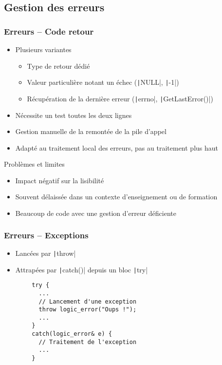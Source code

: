\documentclass[C++.tex]{subfiles}
\begin{document}
\subsection*{Gestion des erreurs}
\begin{frame}[fragile]
	\frametitle{Erreurs -- Code retour}
	\begin{itemize}
		\item Plusieurs variantes
		\begin{itemize}
			\item Type de retour dédié
			\item Valeur particulière notant un échec (\texttt|NULL|, \texttt|-1|)
			\item Récupération de la dernière erreur (\texttt|errno|, \texttt|GetLastError()|)
		\end{itemize}
		\item Nécessite \og un test toutes les deux lignes\fg{}
		\item Gestion manuelle de la remontée de la pile d'appel
		\item Adapté au traitement local des erreurs, pas au traitement \og plus haut\fg{}
	\end{itemize}

	\begin{alertblock}{Problèmes et limites}
		\begin{itemize}
			\item Impact négatif sur la lisibilité
			\item Souvent délaissée dans un contexte d'enseignement ou de formation
			\item Beaucoup de code avec une gestion d'erreur déficiente
		\end{itemize}
	\end{alertblock}
\end{frame}

\begin{frame}[fragile]
	\frametitle{Erreurs -- Exceptions}
	\begin{itemize}
		\item Lancées par \texttt|throw|
		\item Attrapées par \texttt|catch()| depuis un bloc \texttt|try|
	\end{itemize}

	\begin{verbatim}
		try {
		  ...
		  // Lancement d'une exception
		  throw logic_error("Oups !");
		  ...
		}
		catch(logic_error& e) {
		  // Traitement de l'exception
		  ...
		}
	\end{verbatim}
\end{frame}
\end{document}
